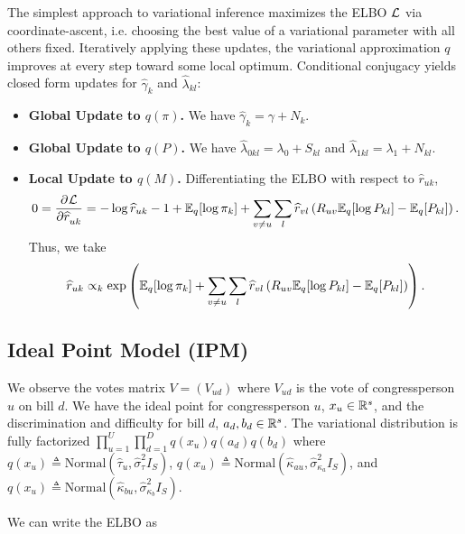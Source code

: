 \documentclass{article}
\begin{document}
 The simplest approach to variational inference maximizes the ELBO $\mathcal{L}$ via coordinate-ascent, i.e. choosing the best value of a variational parameter with all others fixed. Iteratively applying these updates, the variational approximation $q$ improves at every step toward some local optimum. Conditional conjugacy yields closed form updates for $\widehat\gamma_k$ and $\widehat\lambda_{kl}$:

\begin{itemize}
\item {\bf Global Update to $q(\pi)$.} We have $\widehat \gamma_{k} = \gamma + N_k$.
\item {\bf Global Update to $q(P)$.} We have $\widehat \lambda_{0kl} = \lambda_0 + S_{kl}$ and $\widehat \lambda_{1kl} = \lambda_1 + N_{kl}$.
\item {\bf Local Update to $q(M)$.} Differentiating the ELBO with respect to $\widehat r_{uk}$,
$$
0 = \frac{\partial^{}\mathcal{L}}{\partial \widehat r_{uk}^{}}= -\log \widehat r_{uk} -1 + \mathbb{E}_q[\log \pi_k]
+ \sum_{v\neq u} \sum_l \widehat r_{vl}\left(R_{uv}\mathbb{E}_q[\log P_{kl}] - \mathbb{E}_q[P_{kl}]\right).
$$
Thus, we take 
$$
\widehat r_{uk} \propto_k \exp\left(\mathbb{E}_q[\log \pi_k]
+ \sum_{v\neq u} \sum_l \widehat r_{vl}\left(R_{uv}\mathbb{E}_q[\log P_{kl}] - \mathbb{E}_q[P_{kl}]\right)\right).
$$
\end{itemize}


\subsection{Ideal Point Model (IPM)}
\label{ipmvi}


We observe the votes matrix $V = (V_{ud})$ where $V_{ud}$ is the vote of congressperson $u$ on bill $d$. We have the ideal point for congressperson $u$, $x_u \in \mathbb{R}^s$, and the discrimination and difficulty for bill $d$, $a_d,b_d \in \mathbb{R}^s$. The variational distribution is fully factorized $\prod_{u=1}^U \prod_{d=1}^D q(x_u)q(a_d)q(b_d)$ where $q(x_u) \triangleq \text{Normal}(\hat{\tau}_u, \hat{\sigma}^2_\tau I_S)$, $q(x_u) \triangleq \text{Normal}(\hat{\kappa}_{au}, \hat{\sigma}^2_{\kappa_a} I_S)$, and $q(x_u) \triangleq \text{Normal}(\hat{\kappa}_{bu}, \hat{\sigma}^2_{\kappa_b} I_S)$. \vspace{.5em}

We can write the ELBO as \vspace{-1em}
\end{document}
